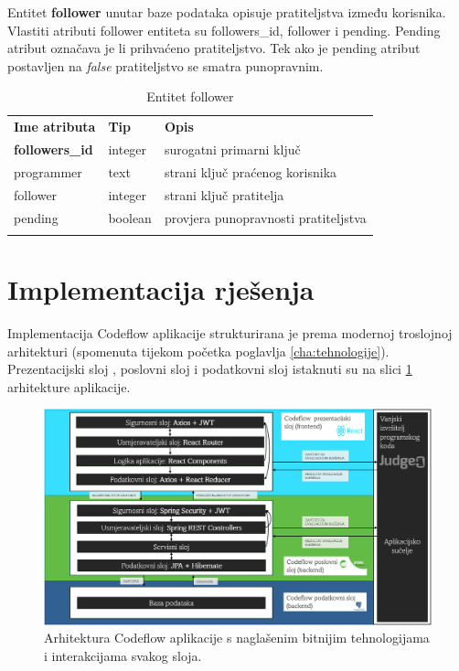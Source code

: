 \documentclass[times, utf8, zavrsni, numeric]{fer}
\begin{document}
		Entitet \textbf{follower} unutar baze podataka opisuje pratiteljstva između korisnika. Vlastiti atributi follower entiteta su followers\_id, follower i pending. Pending atribut označava je li prihvaćeno pratiteljstvo. Tek ako je pending atribut postavljen na \textit{false} pratiteljstvo se smatra punopravnim.
		\begin{table}[H]
			\caption{Entitet follower}
			\label{tbl:follower}
			\centering
			\begin{tabu} to \textwidth {XXX}
				\tabucline[1.75pt]{-}
				\textbf{Ime atributa} & \textbf{Tip} & \textbf{Opis}\\ 				
				\tabucline[1.75pt]{-}
				\textbf{followers\_id} & integer & surogatni primarni ključ\\ \hline
				programmer & text & strani ključ praćenog korisnika\\ \hline
				follower & integer & strani ključ pratitelja\\ \hline
				pending & boolean & provjera punopravnosti pratiteljstva\\ \hline
				\tabucline[1.75pt]{-}
			\end{tabu}
		\end{table}
		
		\section{Implementacija rješenja}
		Implementacija Codeflow aplikacije strukturirana je prema modernoj troslojnoj arhitekturi (spomenuta tijekom početka poglavlja \ref{cha:tehnologije}). Prezentacijski sloj , poslovni sloj i podatkovni sloj   istaknuti su na slici \ref{fig:arh} arhitekture aplikacije.
		\begin{figure}[H]
			\centering
			\includegraphics[width=\linewidth]{pictures/prikazi/Arhitektura.png}
			\caption{Arhitektura Codeflow aplikacije s naglašenim bitnijim tehnologijama i interakcijama svakog sloja.}
			\label{fig:arh}
		\end{figure}
	
\end{document}
